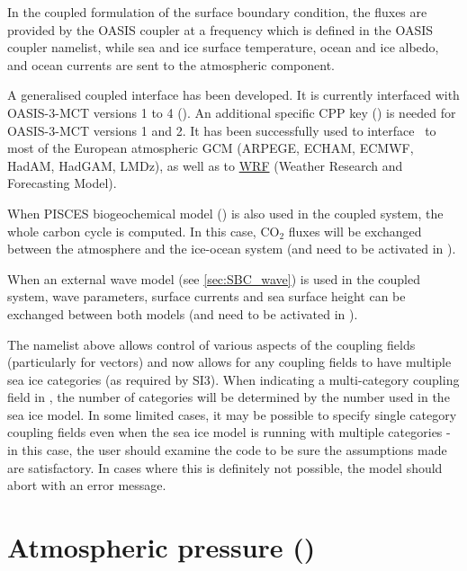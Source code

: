 \documentclass[../main/NEMO_manual]{subfiles}
\begin{document}
In the coupled formulation of the surface boundary condition,
the fluxes are provided by the OASIS coupler at a frequency which is defined in the OASIS coupler namelist,
while sea and ice surface temperature, ocean and ice albedo, and ocean currents are sent to
the atmospheric component.

A generalised coupled interface has been developed.
It is currently interfaced with OASIS-3-MCT versions 1 to 4 ().
An additional specific CPP key () is needed for OASIS-3-MCT versions 1 and 2.
It has been successfully used to interface \NEMO\ to most of the European atmospheric GCM
(ARPEGE, ECHAM, ECMWF, HadAM, HadGAM, LMDz), as well as to \href{http://wrf-model.org/}{WRF}
(Weather Research and Forecasting Model).

When PISCES biogeochemical model () is also used in the coupled system,
the whole carbon cycle is computed.
In this case, CO$_2$ fluxes will be exchanged between the atmosphere and the ice-ocean system
(and need to be activated in  ).


When an external wave model (see \autoref{sec:SBC_wave}) is used in the coupled system, wave parameters, surface currents and sea surface height can be exchanged between both models (and need to be activated in  ).


The namelist above allows control of various aspects of the coupling fields (particularly for vectors) and
now allows for any coupling fields to have multiple sea ice categories (as required by SI3).
When indicating a multi-category coupling field in , the number of categories will be determined by
the number used in the sea ice model.
In some limited cases, it may be possible to specify single category coupling fields even when
the sea ice model is running with multiple categories -
in this case, the user should examine the code to be sure the assumptions made are satisfactory.
In cases where this is definitely not possible, the model should abort with an error message.

\section[Atmospheric pressure (\textit{sbcapr.F90})]{Atmospheric pressure (\protect{})}
\label{sec:SBC_apr}

\begin{listing}
  \caption{}
  \label{lst:namsbc_apr}
\end{listing}
\end{document}
